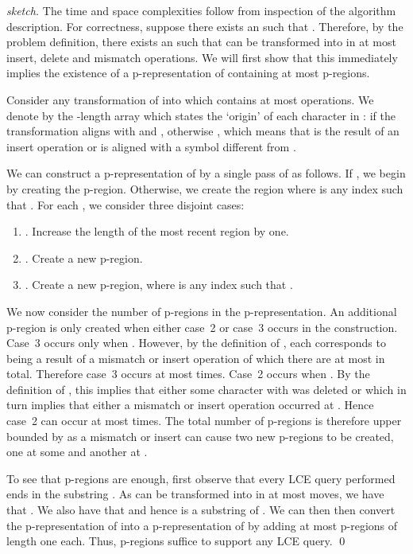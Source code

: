\documentclass[envcountsame]{llncs}
\newcommand{\pregion}{\mbox{p-region}\xspace}
\newcommand{\pregions}{\mbox{p-regions}\xspace}
\newcommand{\prepresentation}{\mbox{p-representation}\xspace}
\begin{document}
\begin{proof}[sketch]
    The time and space complexities follow from inspection of the algorithm description.
For correctness, suppose there exists an  such that . Therefore, by the problem definition, there exists an  such that  can be transformed into  in at most  insert, delete and mismatch operations. We will first show that this immediately implies the existence of a \prepresentation of  containing at most  \pregions.

    Consider any transformation of  into  which contains at most  operations. We denote by  the -length array which states the `origin' of each character in :  if the transformation aligns  with  and , otherwise , which means that  is the result of an insert operation or is aligned with a symbol different from .

    We can construct a \prepresentation  of  by a single pass of  as follows.
    If , we begin by creating the \pregion . Otherwise, we create the region  where  is any index such that .
    For each , we consider three disjoint cases:

    \begin{enumerate}
        \item . Increase the length of the most recent region by one.
        \item . Create a new \pregion .
        \item . Create a new \pregion , where  is any index such that .
    \end{enumerate}







    We now consider the number of \pregions in the \prepresentation . An additional \pregion is only created when either case~2 or case~3 occurs in the construction. Case~3 occurs only when . However, by the definition of , each  corresponds  to being a result of a mismatch or insert operation of which there are at most  in total.
    Therefore case~3 occurs at most  times. Case~2 occurs when . By the definition of , this implies that either some character  with  was deleted or  which in turn implies that either a mismatch or insert operation occurred at . Hence case~2 can occur at most  times. The total number of \pregions is therefore upper bounded by  as a mismatch or insert can cause two new p-regions to be created, one at some  and another at .


    To see that  \pregions are enough, first observe that every LCE query performed ends in the substring .
    As  can be transformed into  in at most  moves, we have that . We also have that  and hence  is a substring of . We can then then convert the \prepresentation  of   into a \prepresentation of  by adding at most  \pregions of length one each. Thus,  \pregions suffice to support any LCE query.    \qed
\end{proof}
\end{document}

